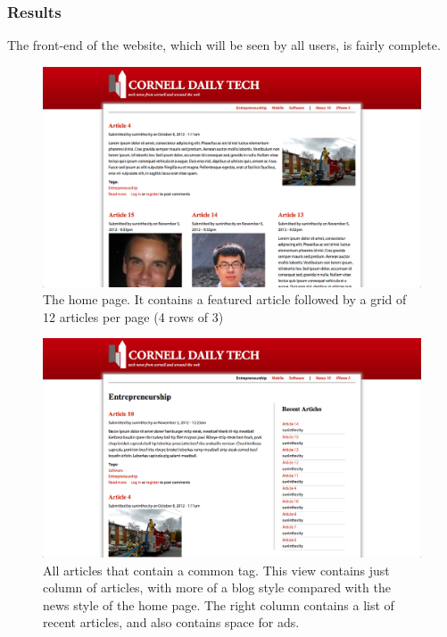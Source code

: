 \documentclass[12pt]{article} %
\begin{document}
\subsubsection{Results}

The front-end of the website, which will be seen by all users, is fairly complete.

\begin{figure}[htbp]
\begin{center}
\includegraphics[width=6in]{images/screenshot1}
\caption{The home page. It contains a featured article followed by a grid of 12 articles per page (4 rows of 3)}
\end{center}
\end{figure}

\begin{figure}[htbp]
\begin{center}
\includegraphics[width=6in]{images/screenshot2}
\caption{All articles that contain a common tag. This view contains just column of articles, with more of a blog style compared with the news style of the home page. The right column contains a list of recent articles, and also contains space for ads.}
\end{center}
\end{figure}
\end{document}
